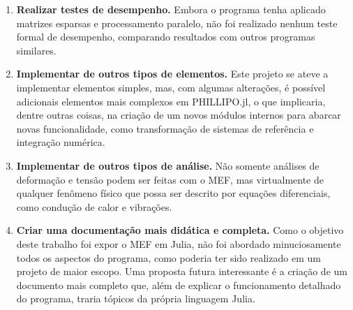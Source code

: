 \begin{enumerate}
    \item \textbf{Realizar testes de desempenho.} Embora o programa tenha aplicado matrizes esparsas e processamento paralelo, não foi realizado nenhum teste formal de desempenho, comparando resultados com outros programas similares.
    \item \textbf{Implementar de outros tipos de elementos.} Este projeto se ateve a implementar elementos simples, mas, com algumas alterações, é possível adicionais elementos mais complexos em PHILLIPO.jl, o que implicaria, dentre outras coisas, na criação de um novos módulos internos para abarcar novas funcionalidade, como transformação de sistemas de referência e integração numérica.
    \item \textbf{Implementar de outros tipos de análise.} Não somente análises de deformação e tensão podem ser feitas com o MEF, mas virtualmente de qualquer fenômeno físico que possa ser descrito por equações diferenciais, como condução de calor e vibrações.
    \item \textbf{Criar uma documentação mais didática e completa.} Como o objetivo deste trabalho foi expor o MEF em Julia, não foi abordado minuciosamente todos os aspectos do programa, como poderia ter sido realizado em um projeto de maior escopo. Uma proposta futura interessante é a criação de um documento mais completo que, além de explicar o funcionamento detalhado do programa, traria tópicos da própria linguagem Julia.
\end{enumerate}

